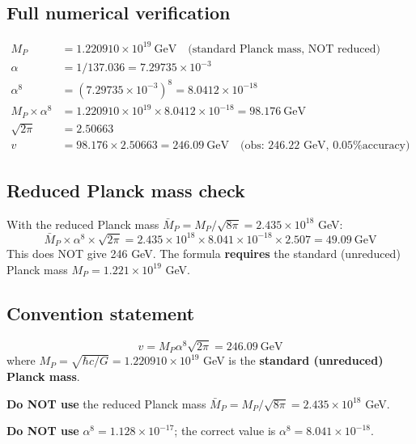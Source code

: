 \documentclass[11pt,a4paper]{article}
\begin{document}
\subsection{Full numerical verification}

\begin{align}
M_P &= 1.220910 \times 10^{19}~\text{GeV} \quad \text{(standard Planck mass, NOT reduced)} \\
\alpha &= 1/137.036 = 7.29735 \times 10^{-3} \\
\alpha^8 &= (7.29735 \times 10^{-3})^8 = 8.0412 \times 10^{-18} \\
M_P \times \alpha^8 &= 1.220910 \times 10^{19} \times 8.0412 \times 10^{-18} = 98.176~\text{GeV} \\
\sqrt{2\pi} &= 2.50663 \\
v &= 98.176 \times 2.50663 = \boxed{246.09~\text{GeV}} \quad \text{(obs: 246.22 GeV, 0.05\% accuracy)}
\end{align}

\subsection{Reduced Planck mass check}

With the reduced Planck mass $\bar{M}_P = M_P / \sqrt{8\pi} = 2.435 \times 10^{18}$ GeV:
\begin{equation}
\bar{M}_P \times \alpha^8 \times \sqrt{2\pi} = 2.435 \times 10^{18} \times 8.041 \times 10^{-18} \times 2.507 = 49.09~\text{GeV}
\end{equation}
This does NOT give 246 GeV. The formula \textbf{requires} the standard (unreduced) Planck mass $M_P = 1.221 \times 10^{19}$ GeV.

\subsection{Convention statement}

\begin{tcolorbox}[colback=yellow!5!white, colframe=orange!60!black,
  title={MANDATORY CONVENTION (for all future iterations)}]
\begin{equation}
v = M_P \alpha^8 \sqrt{2\pi} = 246.09~\text{GeV}
\end{equation}
where $M_P = \sqrt{\hbar c / G} = 1.220910 \times 10^{19}$ GeV is the \textbf{standard (unreduced) Planck mass}.

\textbf{Do NOT use} the reduced Planck mass $\bar{M}_P = M_P / \sqrt{8\pi} = 2.435 \times 10^{18}$ GeV.

\textbf{Do NOT use} $\alpha^8 = 1.128 \times 10^{-17}$; the correct value is $\alpha^8 = 8.041 \times 10^{-18}$.
\end{tcolorbox}
\end{document}

